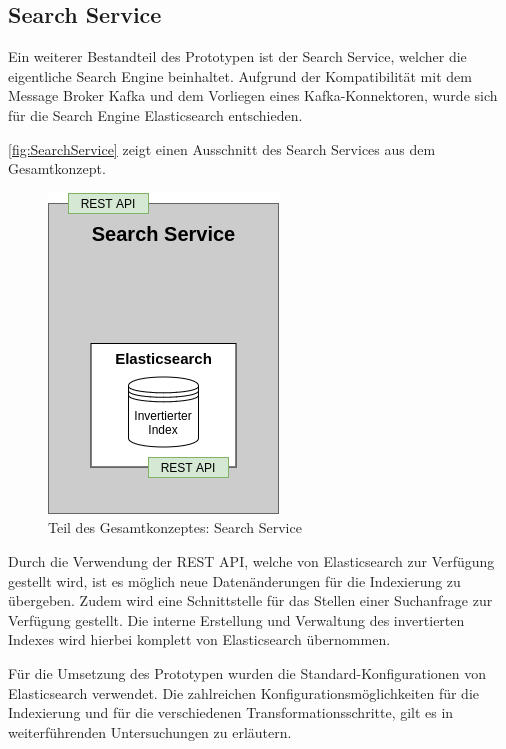 
\subsection{Search Service\label{sec5.2.3:Unterunterpunkt-3}}

Ein weiterer Bestandteil des Prototypen ist der Search Service, welcher die eigentliche Search Engine beinhaltet. Aufgrund der Kompatibilität mit dem Message Broker Kafka und dem Vorliegen eines Kafka-Konnektoren, wurde sich für die Search Engine Elasticsearch entschieden.

\autoref{fig:SearchService} zeigt einen Ausschnitt des Search Services aus dem Gesamtkonzept.

\begin{figure}[H]
    \centering
    \includegraphics[width=0.3\linewidth]{images/SearchService.png}
    \caption{Teil des Gesamtkonzeptes: Search Service}
    \label{fig:SearchService}
\end{figure}

Durch die Verwendung der REST API, welche von Elasticsearch zur Verfügung gestellt wird, ist es möglich neue Datenänderungen für die Indexierung zu übergeben. Zudem wird eine Schnittstelle für das Stellen einer Suchanfrage zur Verfügung gestellt. Die interne Erstellung und Verwaltung des invertierten Indexes wird hierbei komplett von Elasticsearch übernommen.

Für die Umsetzung des Prototypen wurden die Standard-Konfigurationen von Elasticsearch verwendet. Die zahlreichen Konfigurationsmöglichkeiten für die Indexierung und für die verschiedenen Transformationsschritte, gilt es in weiterführenden Untersuchungen zu erläutern.